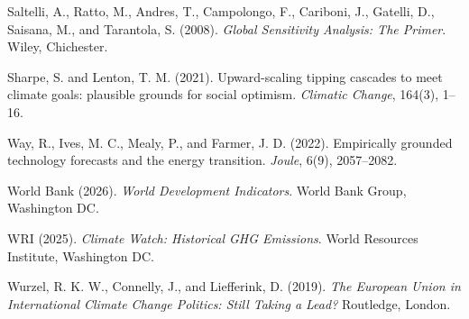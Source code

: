 \documentclass[10pt,a4paper]{article}
\begin{document}
\begin{list}{}{\setlength\leftmargin{1.5em}\setlength\itemindent{-1.5em}\setlength\itemsep{0.4em}}
\item Saltelli, A., Ratto, M., Andres, T., Campolongo, F., Cariboni, J., Gatelli, D., Saisana, M., and
Tarantola, S. (2008). \textit{Global Sensitivity Analysis: The Primer}. Wiley, Chichester.

\item Sharpe, S. and Lenton, T. M. (2021). Upward-scaling tipping cascades to meet climate goals:
plausible grounds for social optimism. \textit{Climatic Change}, 164(3), 1--16.

\item Way, R., Ives, M. C., Mealy, P., and Farmer, J. D. (2022). Empirically grounded technology
forecasts and the energy transition. \textit{Joule}, 6(9), 2057--2082.

\item World Bank (2026). \textit{World Development Indicators}. World Bank Group, Washington DC.

\item WRI (2025). \textit{Climate Watch: Historical GHG Emissions}. World Resources Institute,
Washington DC.

\item Wurzel, R. K. W., Connelly, J., and Liefferink, D. (2019). \textit{The European Union in International
Climate Change Politics: Still Taking a Lead?} Routledge, London.

\end{list}
\end{document}
